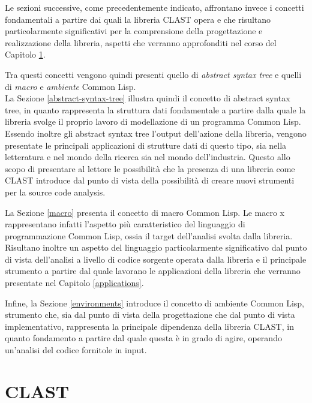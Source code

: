 \documentclass{book}
\begin{document}
Le sezioni successive, come precedentemente indicato, affrontano invece i
concetti fondamentali a partire dai quali la libreria CLAST opera e che
risultano particolarmente significativi per la comprensione della progettazione
e realizzazione della libreria, aspetti che verranno approfonditi nel corso del
Capitolo \ref{library}.

Tra questi concetti vengono quindi presenti quello di
\textit{abstract syntax tree} e quelli di \textit{macro} e \textit{ambiente}
Common Lisp.\\

La Sezione \ref{abstract-syntax-tree} illustra quindi il concetto di abstract
syntax tree, in quanto rappresenta la struttura dati fondamentale a partire
dalla quale la libreria svolge il proprio lavoro di modellazione di un programma
Common Lisp. Essendo inoltre gli abstract syntax tree l'output dell'azione della
libreria, vengono presentate le principali applicazioni di strutture dati di
questo tipo, sia nella letteratura e nel mondo della ricerca sia nel mondo
dell'industria. Questo allo scopo di presentare al lettore le possibilità che la
presenza di una libreria come CLAST introduce dal punto di vista della
possibilità di creare nuovi strumenti per la source code analysis.

La Sezione \ref{macro} presenta il concetto di macro Common Lisp. Le macro x
rappresentano infatti l'aspetto più caratteristico del linguaggio di
programmazione Common Lisp, ossia il target dell'analisi svolta dalla libreria.
Risultano inoltre un aspetto del linguaggio particolarmente significativo dal
punto di vista dell'analisi a livello di codice sorgente operata dalla libreria
e il principale strumento a partire dal quale lavorano le applicazioni della
libreria che verranno presentate nel Capitolo \ref{applications}.

Infine, la Sezione \ref{environments} introduce il concetto di ambiente Common
Lisp, strumento che, sia dal punto di vista della progettazione che dal punto di
vista implementativo, rappresenta la principale dipendenza della libreria CLAST,
in quanto fondamento a partire dal quale questa è in grado di agire, operando
un'analisi del codice fornitole in input.






\endgroup

\begingroup
\let\clearpage\relax

\chapter{CLAST}
\label{library}
\end{document}
